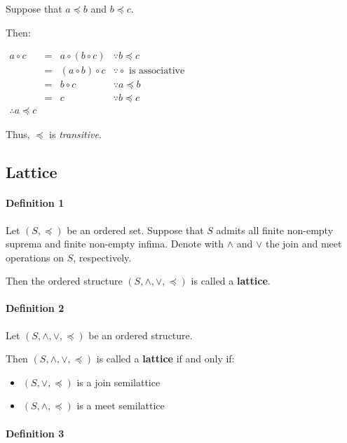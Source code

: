 Suppose that $a \preceq b$ and $b \preceq c$.

Then:

\begin{math}
  \begin{array}{lcll}
    a \circ c & = & a \circ (b \circ c) & \because b \preceq c \\
              & = & (a \circ b) \circ c & \because \circ \text{ is associative} \\
              & = & b \circ c & \because a \preceq b \\
              & = & c & \because b \preceq c \\
    \therefore a \preceq c
  \end{array}
\end{math}

Thus, $\preceq$ is \textit{transitive}.


\subsection{Lattice}
\label{sec:lattice}

\paragraph{Definition 1}

Let $(S, \preceq)$ be an ordered set. Suppose that $S$ admits all
finite non-empty suprema and finite non-empty infima. Denote with
$\wedge$ and $\vee$ the join and meet operations on $S$, respectively.

Then the ordered structure $(S, \wedge, \vee, \preceq)$ is called a
\textbf{lattice}.

\paragraph{Definition 2}

Let $(S, \wedge, \vee, \preceq)$ be an ordered structure.

Then $(S, \wedge, \vee, \preceq)$ is called a \textbf{lattice} if and
only if:

\begin{itemize}
\item $(S,\vee, \preceq)$ is a join semilattice
\item $(S,\wedge, \preceq)$ is a meet semilattice
\end{itemize}

\paragraph{Definition 3}

